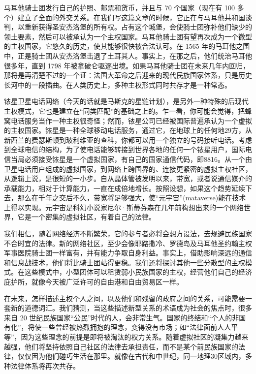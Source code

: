 马耳他骑士团发行自己的护照、邮票和货币，并且与 70 个国家（现在有 100 多个）建立了全面的外交关系。在我们写这篇文章的时候，它正在与马耳他共和国谈判，以重新获得圣安杰洛堡的所有权。占有这个城堡，会使骑士团弥补他们缺少的领土要素，然后可以被承认为一个主权国家。马耳他骑士团有望再次成为一个微型的主权国家，它悠久的历史，使其能够很快被合法认可。在 1565 年的马耳他之围中，正是骑士团从安杰洛堡击退了土耳其人。事实上，在那之后，他们统治马耳他很多年，直到 1798 年被拿破仑驱逐出境。如果马耳他骑士团在未来几年内回归，那将是再清楚不过的一个证：法国大革命之后迎来的现代民族国家体系，只是历史长河中的一段插曲。在人类历史上，多种主权形式同时共存才是一种常态。


铱星卫星电话网络（今天的话就是马斯克的星链计划），是另外一种特殊的后现代主权模式，它也是建立在“同类匹配”的基础之上的。乍一看，你可能会觉得，把蜂窝电话服务当作一种主权很奇怪；然而，铱星公司已经被国际普遍承认为一个虚拟的主权国家。铱星是一种全球移动电话服务，通过它，在地球上的任何地29方，从新西兰的费瑟斯顿到玻利维亚的查科，你都可以用一个独立的号码接听电话。考虑到全球电信的结构，为了使电话能够转接到世界各地的任何一个铱星用户，国际电信当局必须接受铱星是一个虚拟国家，有自己的国家通信代码，即8816。从一个由卫星电话用户组成的虚拟国家，到网络上跨国界的、连接更紧密的虚拟主权社区，从逻辑上说，是很短的一小步。自从晶体管被发明以来，带宽，或者说通信媒介的承载能力，相对于计算能力，一直在成倍地增长。按照设想，如果这个趋势延续下去，那么在千年之交后不久，带宽将足够强大，使“元宇宙”(mataverse)能在技术上得以实现。元宇宙是科幻小说家尼尔·斯蒂芬森在几年前构想出来的一个网络世界，它是一个密集的虚拟社区，有着自己的法律。


我们相信，随着网络经济不断繁荣，它的参与者必将会想方设法，去规避民族国家不合时宜的法律。新的网络社区，至少会像耶路撒冷、罗德岛及马耳他圣约翰主权军事医院骑士团一样富有，并有能力争取自身利益。事实上，借助影响深远的通信和信息战技术，他们将比骑士团站得更稳。我们还将探讨其他一些分散型的主权模式。在这些模式中，小型团体可以租赁弱小民族国家的主权，经营他们自己的经济庇护所，就像今天被广泛许可的自由港和自由贸易区一样。


在未来，怎样描述主权个人之间，以及他们和残留的政府之间的关系，可能需要一套新的道德词汇。我们猜测，当这些描述新型关系的术语成为社会的焦点时，很多来自 20 世纪民族国家“公民”时代的人，会非常生气。国家的终结和“个人的非国有化”，将使一些曾经被热烈拥抱的理念，变得没有市场；如“法律面前人人平等”，因为这些理念的前提是即将被淘汰的权力关系。随着虚拟社区的凝集力越来越强，他们将坚持依照自己社区的法律去承担责任，而不是某个前民族国家的法律，仅仅因为他们碰巧生活在那里。就像在古代和中世纪，同一地理30区域内，多种法律体系将再次共存。


